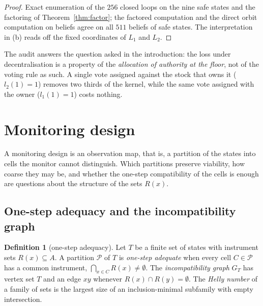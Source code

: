 \documentclass[11pt,a4paper]{article}
\theoremstyle{plain}
\theoremstyle{definition}
\newtheorem{definition}[theorem]{Definition}
\theoremstyle{remark}
\newcommand{\calP}{\mathcal{P}}
\begin{document}
\begin{proof}
Exact enumeration of the $256$ closed loops on the nine safe states and the factoring of Theorem~\ref{thm:factor}; the factored computation and the direct orbit computation on beliefs agree on all $511$ beliefs of safe states. The interpretation in (b) reads off the fixed coordinates of $L_1$ and $L_2$.
\end{proof}

The audit answers the question asked in the introduction: the loss under decentralisation is a property of the \emph{allocation of authority at the floor}, not of the voting rule as such. A single vote assigned against the stock that owns it ($l_2(1)=1$) removes two thirds of the kernel, while the same vote assigned with the owner ($l_1(1)=1$) costs nothing.
\section{Monitoring design}\label{sec:monitor}

A monitoring design is an observation map, that is, a partition of the states into cells the monitor cannot distinguish. Which partitions preserve viability, how coarse they may be, and whether the one-step compatibility of the cells is enough are questions about the structure of the sets $R(x)$.

\subsection{One-step adequacy and the incompatibility graph}

\begin{definition}[one-step adequacy]\label{def:adequacy}
Let $T$ be a finite set of states with instrument sets $R(x)\subseteq A$. A partition $\calP$ of $T$ is \emph{one-step adequate} when every cell $C\in\calP$ has a common instrument, $\bigcap_{x\in C}R(x)\neq\emptyset$. The \emph{incompatibility graph} $G_T$ has vertex set $T$ and an edge $xy$ whenever $R(x)\cap R(y)=\emptyset$. The \emph{Helly number} of a family of sets is the largest size of an inclusion-minimal subfamily with empty intersection.
\end{definition}
\end{document}

